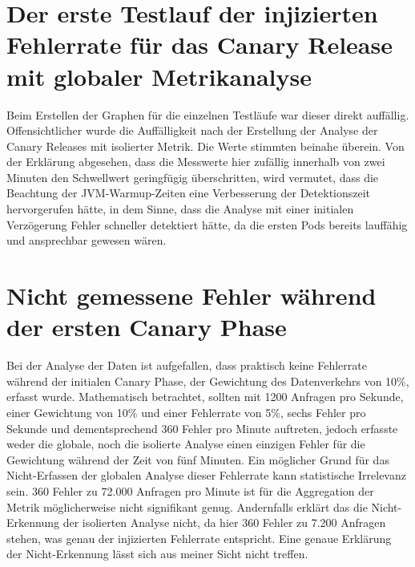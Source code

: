 \documentclass[
12pt,
a4paper,
twoside,
openright
]{report}
\begin{document}
	\section{Der erste Testlauf der injizierten Fehlerrate für das Canary Release mit globaler Metrikanalyse}
	Beim Erstellen der Graphen für die einzelnen Testläufe war dieser direkt auffällig. Offensichtlicher wurde die Auffälligkeit nach der Erstellung der Analyse der Canary Releases mit isolierter Metrik. Die Werte stimmten beinahe überein. Von der Erklärung abgesehen, dass die Messwerte hier zufällig innerhalb von zwei Minuten den Schwellwert geringfügig überschritten, wird vermutet, dass die Beachtung der JVM-Warmup-Zeiten eine Verbesserung der Detektionszeit hervorgerufen hätte, in dem Sinne, dass die Analyse mit einer initialen Verzögerung Fehler schneller detektiert hätte, da die ersten Pods bereits lauffähig und ansprechbar gewesen wären.
	
	\section{Nicht gemessene Fehler während der ersten Canary Phase}
	Bei der Analyse der Daten ist aufgefallen, dass praktisch keine Fehlerrate während der initialen Canary Phase, der Gewichtung des Datenverkehrs von 10\%, erfasst wurde. Mathematisch betrachtet, sollten mit 1200 Anfragen pro Sekunde, einer Gewichtung von 10\% und einer Fehlerrate von 5\%, sechs Fehler pro Sekunde und dementsprechend 360 Fehler pro Minute auftreten, jedoch erfasste weder die globale, noch die isolierte Analyse einen einzigen Fehler für die Gewichtung während der Zeit von fünf Minuten. Ein möglicher Grund für das Nicht-Erfassen der globalen Analyse dieser Fehlerrate kann statistische Irrelevanz sein. 360 Fehler zu 72.000 Anfragen pro Minute ist für die Aggregation der Metrik möglicherweise nicht signifikant genug. Andernfalls erklärt das die Nicht-Erkennung der isolierten Analyse nicht, da hier 360 Fehler zu 7.200 Anfragen stehen, was genau der injizierten Fehlerrate entspricht.  Eine genaue Erklärung der Nicht-Erkennung lässt sich aus meiner Sicht nicht treffen.
	
\end{document}

